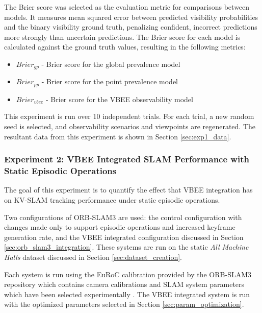 The Brier score was selected as the evaluation metric for comparisons between models. It measures mean squared error between predicted visibility probabilities and the binary visibility ground truth, penalizing confident, incorrect predictions more strongly than uncertain predictions. The Brier score for each model is calculated against the ground truth values, resulting in the following metrics:
\begin{itemize}
    \item $Brier_{gp}$ - Brier score for the global prevalence model
    \item $Brier_{pp}$ - Brier score for the point prevalence model
    \item $Brier_{vbee}$ - Brier score for the VBEE observability model
\end{itemize}

This experiment is run over 10 independent trials. For each trial, a new random seed is selected, and observability scenarios and viewpoints are regenerated. The resultant data from this experiment is shown in Section \ref{sec:exp1_data}.

\subsubsection*{Experiment 2: VBEE Integrated SLAM Performance with Static Episodic Operations}
The goal of this experiment is to quantify the effect that VBEE integration has on KV-SLAM tracking performance under static episodic operations.

Two configurations of ORB-SLAM3 are used: the control configuration with changes made only to support episodic operations and increased keyframe generation rate, and the VBEE integrated configuration discussed in Section \ref{sec:orb_slam3_integration}. These systems are run on the static \textit{All Machine Halls} dataset discussed in Section \ref{sec:dataset_creation}.

Each system is run using the EuRoC calibration provided by the ORB-SLAM3 repository which contains camera calibrations and SLAM system parameters which have been selected experimentally \cite{mur-artalORBSLAMVersatileAccurate2015}. %
The VBEE integrated system is run with the optimized parameters selected in Section \ref{sec:param_optimization}.

